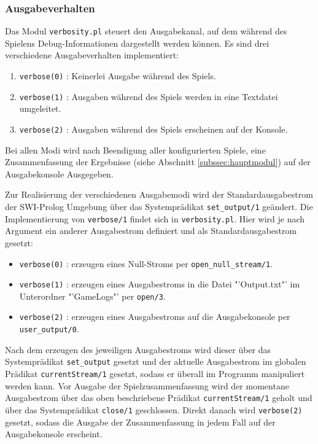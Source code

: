 \subsubsection{Ausgabeverhalten} %
\label{ssub:ausgabeverhalten}
		Das Modul \texttt{verbosity.pl} steuert den Ausgabekanal, auf dem während des Spielens Debug-Informationen dargestellt werden können. 
		Es sind drei verschiedene Ausgabeverhalten implementiert:
			\begin{enumerate}
				\item \texttt{verbose(0)} : Keinerlei Ausgabe während des Spiels.
				\item \texttt{verbose(1)} : Ausgaben während des Spiels werden in eine Textdatei umgeleitet.
				\item \texttt{verbose(2)} : Ausgaben während des Spiels erscheinen auf der Konsole.
			\end{enumerate}
			Bei allen Modi wird nach Beendigung aller konfigurierten Spiele, eine Zusammenfassung der Ergebnisse (siehe Abschnitt \ref{subssec:hauptmodul}) 
			auf der Ausgabekonsole Ausgegeben.

			Zur Realisierung der verschiedenen Ausgabemodi wird der Standardausgabestrom der SWI-Prolog Umgebung über das Systemprädikat \texttt{set\_output/1} 
			geändert. Die Implementierung von \texttt{verbose/1} findet sich in \texttt{verbosity.pl}. Hier wird je nach Argument ein anderer Ausgabestrom 
			definiert und als Standardausgabestrom gesetzt:
			\begin{itemize}
				\item \texttt{verbose(0)} : erzeugen eines Null-Stroms per \texttt{open\_null\_stream/1}.
				\item \texttt{verbose(1)} : erzeugen eines Ausgabestroms in die Datei "'Output.txt"' im Unterordner "'GameLogs"' per \texttt{open/3}.
				\item \texttt{verbose(2)} : erzeugen eines Ausgabestroms auf die Ausgabekonsole per \texttt{user\_output/0}.
			\end{itemize}
			Nach dem erzeugen des jeweiligen Ausgabestroms wird dieser über das Systemprädikat \texttt{set\_output} gesetzt und der aktuelle Ausgabestrom 
			im globalen Prädikat \texttt{currentStream/1} gesetzt, sodass er überall im Programm manipuliert werden kann.
			Vor Ausgabe der Spielzusammenfassung wird der momentane Ausgabestrom über das oben beschriebene Prädikat \texttt{currentStream/1} geholt und 
			über das Systemprädikat \texttt{close/1} geschlossen. Direkt danach wird \texttt{verbose(2)} gesetzt, sodass die Ausgabe 
			der Zusammenfassung in jedem Fall auf der Ausgabekonsole erscheint.
	


